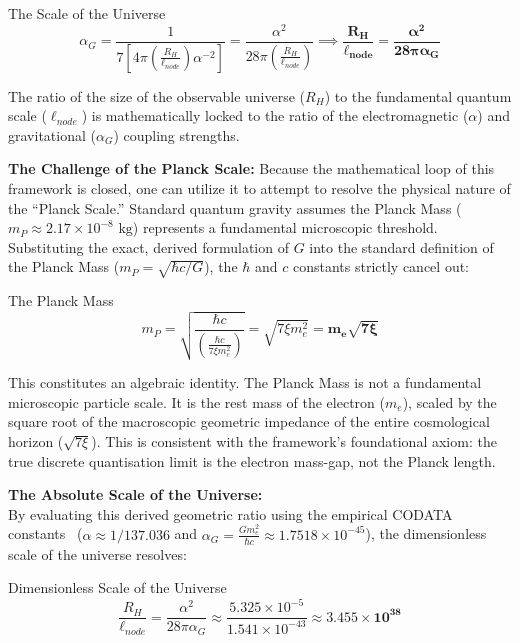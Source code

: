 \begin{resultbox}{The Scale of the Universe}
\begin{equation}
\alpha_{G}=\frac{1}{7\left[4\pi\left(\frac{R_{H}}{\ell_{node}}\right)\alpha^{-2}\right]}=\frac{\alpha^{2}}{28\pi\left(\frac{R_{H}}{\ell_{node}}\right)}\implies \mathbf{\frac{R_{H}}{\ell_{node}}=\frac{\alpha^{2}}{28\pi\alpha_{G}}}
\end{equation}
\end{resultbox}

The ratio of the size of the observable universe ($R_{H}$) to the fundamental quantum scale ($\ell_{node}$) is mathematically locked to the ratio of the electromagnetic ($\alpha$) and gravitational ($\alpha_{G}$) coupling strengths.

\textbf{The Challenge of the Planck Scale:} Because the mathematical loop of this framework is closed, one can utilize it to attempt to resolve the physical nature of the ``Planck Scale.'' Standard quantum gravity assumes the Planck Mass ($m_{P}\approx2.17\times10^{-8}\text{ kg}$) represents a fundamental microscopic threshold. Substituting the exact, derived formulation of $G$ into the standard definition of the Planck Mass ($m_{P}=\sqrt{\hbar c/G}$), the $\hbar$ and $c$ constants strictly cancel out:

\begin{resultbox}{The Planck Mass}
\begin{equation}
m_{P}=\sqrt{\frac{\hbar c}{\left(\frac{\hbar c}{7\xi m_{e}^{2}}\right)}}=\sqrt{7\xi m_{e}^{2}}=\mathbf{m_{e}\sqrt{7\xi}}
\end{equation}
\end{resultbox}

This constitutes an algebraic identity. The Planck Mass is not a fundamental microscopic particle scale. It is the rest mass of the electron ($m_{e}$), scaled by the square root of the macroscopic geometric impedance of the entire cosmological horizon ($\sqrt{7\xi}$). This is consistent with the framework's foundational axiom: the true discrete quantisation limit is the electron mass-gap, not the Planck length.

\vspace{1em}
\noindent\textbf{The Absolute Scale of the Universe:} \\
By evaluating this derived geometric ratio using the empirical CODATA constants~\cite{codata2018} ($\alpha \approx 1/137.036$ and $\alpha_G = \frac{G m_e^2}{\hbar c} \approx 1.7518 \times 10^{-45}$), the dimensionless scale of the universe resolves:
\begin{resultbox}{Dimensionless Scale of the Universe}
\begin{equation}
\frac{R_H}{\ell_{node}} = \frac{\alpha^2}{28\pi\alpha_G} \approx \frac{5.325 \times 10^{-5}}{1.541 \times 10^{-43}} \approx \mathbf{3.455 \times 10^{38}}
\end{equation}
\end{resultbox}

